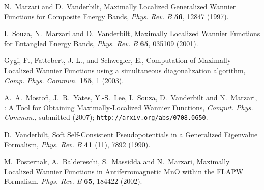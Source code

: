 \documentclass[a4paper,11pt,twoside]{book}
\begin{document}
\begin{thebibliography}{99}


 N.~Marzari and D.~Vanderbilt, 
  Maximally Localized Generalized Wannier Functions for Composite
  Energy Bands, {\it Phys. Rev. B} {\bf 56}, 12847 (1997).  

 I.~Souza, N.~Marzari and D.~Vanderbilt, Maximally
     Localized Wannier Functions for Entangled Energy Bands, {\it
     Phys. Rev. B} {\bf 65}, 035109 (2001).

 Gygi, F., Fattebert, J.-L., and Schwegler, E.,
 Computation of Maximally Localized Wannier Functions using a
 simultaneous diagonalization algorithm, {\it Comp. Phys. Commun.}
 {\bf 155}, 1 (2003).

 A.~A.~Mostofi, J.~R.~Yates, Y.-S.~Lee, I.~Souza,
   D.~Vanderbilt and N.~Marzari, \wannier: A Tool for Obtaining
   Maximally-Localized Wannier Functions, {\it Comput. Phys. Commun.},
   submitted (2007); {\tt http://arxiv.org/abs/0708.0650}.

 D.~Vanderbilt, Soft Self-Consistent Pseudopotentials in
  a Generalized Eigenvalue Formalism, {\it Phys. Rev. B} {\bf 41}
  (11), 7892 (1990).

 M.~Posternak, A.~Baldereschi, S.~Massidda and
  N.~Marzari, Maximally Localized Wannier Functions in
  Antiferromagnetic MnO within the FLAPW Formalism, {\it Phys. Rev. B}
  {\bf 65}, 184422 (2002).



\end{thebibliography}
\end{document}
